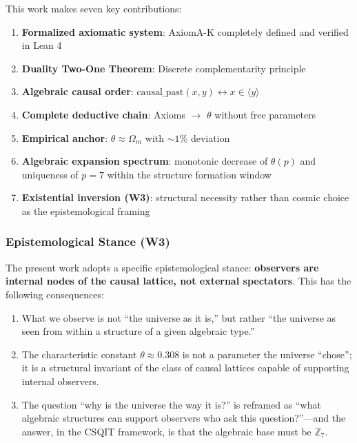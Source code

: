 \documentclass[aps,prd,twocolumn,nofootinbib,floatfix]{revtex4-2}
\begin{document}
This work makes seven key contributions:

\begin{enumerate}
    \item \textbf{Formalized axiomatic system}: AxiomA-K completely defined and verified in Lean 4
    \item \textbf{Duality Two-One Theorem}: Discrete complementarity principle
    \item \textbf{Algebraic causal order}: $\text{causal\_past}(x,y) \leftrightarrow x \in \langle y \rangle$
    \item \textbf{Complete deductive chain}: Axioms $\rightarrow$ $\theta$ without free parameters
    \item \textbf{Empirical anchor}: $\theta \approx \Omega_m$ with $\sim 1\%$ deviation
    \item \textbf{Algebraic expansion spectrum}: monotonic decrease of $\theta(p)$ and uniqueness of $p=7$ within the structure formation window
    \item \textbf{Existential inversion (W3)}: structural necessity rather than cosmic choice as the epistemological framing
\end{enumerate}

\subsubsection{Epistemological Stance (W3)}

The present work adopts a specific epistemological stance: \textbf{observers are internal nodes of the causal lattice, not external spectators}. This has the following consequences:

\begin{enumerate}
    \item What we observe is not ``the universe as it is,'' but rather ``the universe as seen from within a structure of a given algebraic type.''
    \item The characteristic constant $\theta \approx 0.308$ is not a parameter the universe ``chose''; it is a structural invariant of the class of causal lattices capable of supporting internal observers.
    \item The question ``why is the universe the way it is?'' is reframed as ``what algebraic structures can support observers who ask this question?''---and the answer, in the CSQIT framework, is that the algebraic base must be $\mathbb{Z}_7$.
\end{enumerate}
\end{document}
